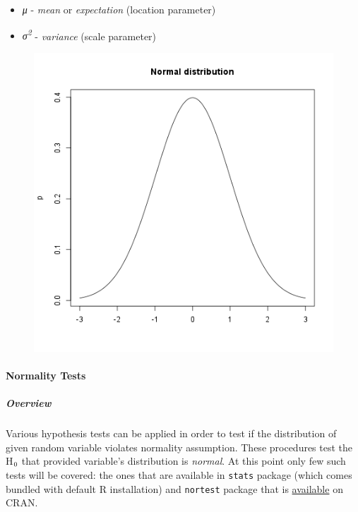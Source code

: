 \documentclass[]{article}
\makeatletter
\def\maxwidth{\ifdim\Gin@nat@width>\linewidth\linewidth
\else\Gin@nat@width\fi}
\let\Oldincludegraphics\includegraphics
\renewcommand{\includegraphics}[1]{\Oldincludegraphics[width=\maxwidth]{#1}}
\newcommand{\textsubscr}[1]{\ensuremath{_{\scriptsize\textrm{#1}}}}
\makeatother
\begin{document}
\begin{itemize}
\item
  \emph{μ} - \emph{mean} or \emph{expectation} (location parameter)
\item
  \emph{σ\textsuperscript{2}} - \emph{variance} (scale parameter)
\end{itemize}
\begin{figure}[htbp]
\centering
\includegraphics{2f8c434e103f36ec70966b372838d448.png}
\caption{}
\end{figure}

\paragraph{Normality Tests}

\subparagraph{Overview}

Various hypothesis tests can be applied in order to test if the
distribution of given random variable violates normality assumption.
These procedures test the H\textsubscr{0} that provided variable's
distribution is \emph{normal}. At this point only few such tests will be
covered: the ones that are available in \texttt{stats} package (which
comes bundled with default R installation) and \texttt{nortest} package
that is
\href{http://cran.r-project.org/web/packages/nortest/index.html}{available}
on CRAN.
\end{document}
